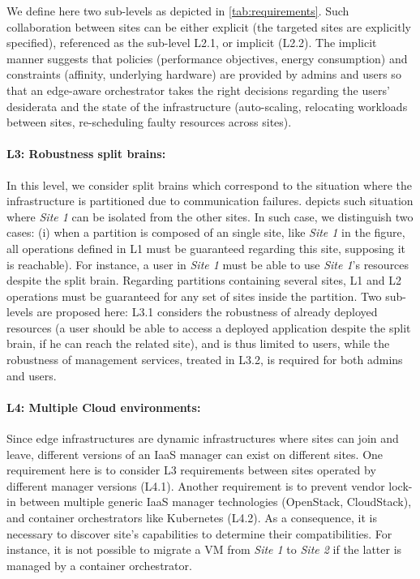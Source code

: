 We define here two sub-levels as depicted in \cref{tab:requirements}. Such
collaboration between sites can be either explicit (\ie the targeted sites are
explicitly specified), referenced as the sub-level L2.1, or implicit (L2.2).
The implicit manner suggests that policies (\eg performance objectives, energy
consumption) and constraints (\eg affinity, underlying hardware) are provided
by admins and users so that an edge-aware orchestrator takes the right
decisions regarding the users' desiderata and the state of the infrastructure
(\eg auto-scaling, relocating workloads between sites, re-scheduling faulty
resources across sites).

\paragraph{L3: Robustness \wrt split brains:}
In this level, we consider split brains which correspond to the situation
where the infrastructure is partitioned due to communication failures.
 depicts such situation where \emph{Site 1} can be
isolated from the other sites. In such case, we distinguish two cases: (i) when
a partition is composed of an single site, like \emph{Site 1} in the figure,
all operations defined in L1 must be guaranteed regarding this site, supposing
it is reachable). For instance, a user in \emph{Site 1} must be
able to use \emph{Site 1}'s resources despite the split brain. Regarding
partitions containing several sites, L1 and L2 operations must be guaranteed
for any set of sites inside the partition.
Two sub-levels are proposed here: L3.1 considers the robustness of already
deployed resources (\eg a user should be able to access a deployed application
despite the split brain, if he can reach the related site), and is thus limited
to users, while the robustness of management services, treated in L3.2, is
required for both admins and users.

\paragraph{L4: Multiple Cloud environments:}
Since edge infrastructures are dynamic infrastructures where sites can join and
leave, different versions of an IaaS manager can exist on different sites. One
requirement here is to consider L3 requirements between sites operated by
different manager versions (L4.1). Another requirement is to prevent vendor
lock-in between multiple generic IaaS manager technologies (\eg OpenStack,
CloudStack), and container orchestrators like Kubernetes (L4.2).
As a consequence, it is necessary to discover site's capabilities to determine
their compatibilities. For instance, it is not possible to migrate a VM from
\emph{Site 1} to \emph{Site 2} if the latter is managed by a container
orchestrator.

